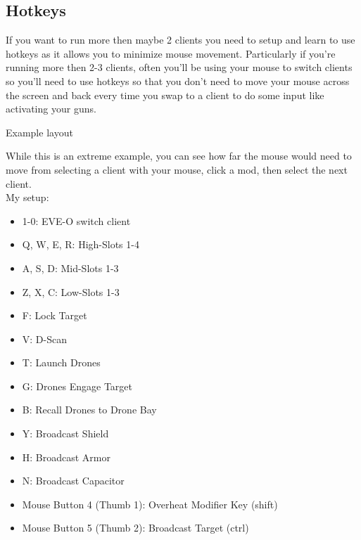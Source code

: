 \documentclass{article}
\begin{document}
\clearpage
\subsection{Hotkeys}

If you want to run more then maybe 2 clients you need to setup and learn to use hotkeys as it allows you 
to minimize mouse movement. Particularly if you're running more then 2-3 clients, often you'll be using your
mouse to switch clients so you'll need to use hotkeys so that you don't need to move your mouse across the
screen and back every time you swap to a client to do some input like activating your guns.
\\
\begin{center}
Example layout
\end{center}
While this is an extreme example, you can see how far the mouse would need to move from selecting a client with your mouse,
click a mod, then select the next client. \\

\noindent My setup: \\

\begin{itemize}
  \item 1-0: EVE-O switch client
  \item Q, W, E, R: High-Slots 1-4
  \item A, S, D: Mid-Slots 1-3
  \item Z, X, C: Low-Slots 1-3
  \item F: Lock Target\
  \item V: D-Scan
  \item T: Launch Drones
  \item G: Drones Engage Target
  \item B: Recall Drones to Drone Bay
  \item Y: Broadcast Shield
  \item H: Broadcast Armor
  \item N: Broadcast Capacitor
  \item Mouse Button 4 (Thumb 1): Overheat Modifier Key (shift)
  \item Mouse Button 5 (Thumb 2): Broadcast Target (ctrl)
\end{itemize}
\end{document}

